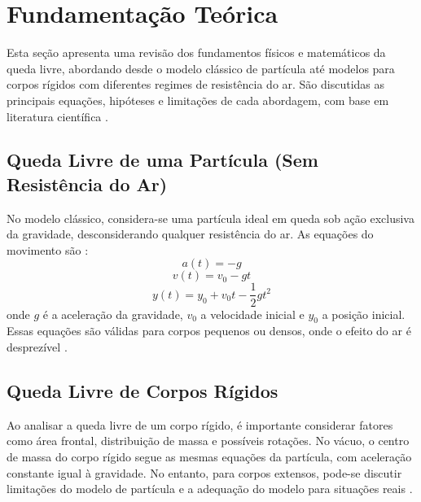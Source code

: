 
\chapter{Fundamentação Teórica}
\label{chap_fundamentacao_teorica}


Esta seção apresenta uma revisão dos fundamentos físicos e matemáticos da queda livre, abordando desde o modelo clássico de partícula até modelos para corpos rígidos com diferentes regimes de resistência do ar. São discutidas as principais equações, hipóteses e limitações de cada abordagem, com base em literatura científica \cite{galilei1638,halliday2011,batchelor2000,tipler2009,butcher2016}.

\section{Queda Livre de uma Partícula (Sem Resistência do Ar)}

No modelo clássico, considera-se uma partícula ideal em queda sob ação exclusiva da gravidade, desconsiderando qualquer resistência do ar. As equações do movimento são \cite{halliday2011,tipler2009}:
\begin{equation}
    a(t) = -g
    \label{eq:acel_queda_livre}
\end{equation}
\begin{equation}
    v(t) = v_0 - g t
    \label{eq:vel_queda_livre}
\end{equation}
\begin{equation}
    y(t) = y_0 + v_0 t - \frac{1}{2} g t^2
    \label{eq:pos_queda_livre}
\end{equation}
onde $g$ é a aceleração da gravidade, $v_0$ a velocidade inicial e $y_0$ a posição inicial. Essas equações são válidas para corpos pequenos ou densos, onde o efeito do ar é desprezível \cite{halliday2011,tipler2009}.



\section{Queda Livre de Corpos Rígidos}

Ao analisar a queda livre de um corpo rígido, é importante considerar fatores como área frontal, distribuição de massa e possíveis rotações. No vácuo, o centro de massa do corpo rígido segue as mesmas equações da partícula, com aceleração constante igual à gravidade. No entanto, para corpos extensos, pode-se discutir limitações do modelo de partícula e a adequação do modelo para situações reais \cite{halliday2011,tipler2009}.


